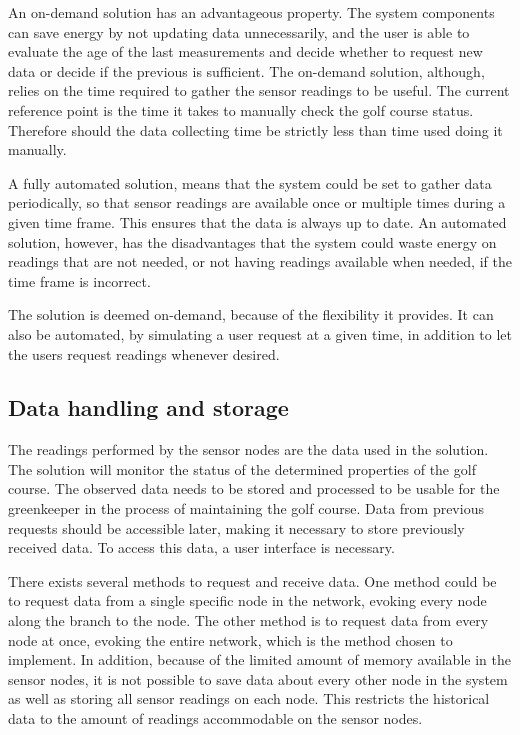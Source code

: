An on-demand solution has an advantageous property. The system components can save energy by not updating data unnecessarily, and the user is able to evaluate the age of the last measurements and decide whether to request new data or decide if the previous is sufficient. The on-demand solution, although, relies on the time required to gather the sensor readings to be useful. The current reference point is the time it takes to manually check the golf course status. Therefore should the data collecting time be strictly less than time used doing it manually.

A fully automated solution, means that the system could be set to gather data periodically, so that sensor readings are available once or multiple times during a given time frame. This ensures that the data is always up to date. An automated solution, however, has the disadvantages that the system could waste energy on readings that are not needed, or not having readings available when needed, if the time frame is incorrect.

The solution is deemed on-demand, because of the flexibility it provides. It can also be automated, by simulating a user request at a given time, in addition to let the users request readings whenever desired.


\subsection{Data handling and storage}
The readings performed by the sensor nodes are the data used in the solution. The solution will monitor the status of the determined properties of the golf course. The observed data needs to be stored and processed to be usable for the greenkeeper in the process of maintaining the golf course. Data from previous requests should be accessible later, making it necessary to store previously received data. To access this data, a user interface is necessary. 

There exists several methods to request and receive data. One method could be to request data from a single specific node in the network, evoking every node along the branch to the node. The other method is to request data from every node at once, evoking the entire network, which is the method chosen to implement. In addition, because of the limited amount of memory available in the sensor nodes, it is not possible to save data about every other node in the system as well as storing all sensor readings on each node. This restricts the historical data to the amount of readings accommodable on the sensor nodes.

